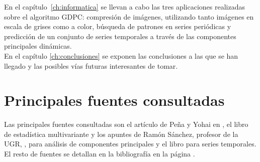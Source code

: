 En el capítulo~\ref{ch:informatica} se llevan a cabo las tres aplicaciones realizadas sobre el algoritmo GDPC: compresión de imágenes, utilizando tanto imágenes en escala de grises como a color, búsqueda de patrones en series periódicas y predicción de un conjunto de series temporales a través de las componentes principales dinámicas.\\

En el capítulo \ref{ch:conclusiones} se exponen las conclusiones a las que se han llegado y las posibles vías futuras interesantes de tomar.\\


\section{Principales fuentes consultadas}
Las principales fuentes consultadas son el artículo de Peña y Yohai en \cite{pena16}, el libro de estadística multivariante \cite{anderson} y los apuntes de Ramón Sánchez, profesor de la UGR, \cite{sanchez}, para análisis de componentes principales y el libro \cite{pena05} para series temporales. El resto de fuentes se detallan en la bibliografía en la página \pageref{bibliography}.


%